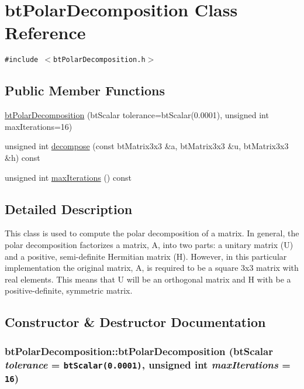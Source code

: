 \hypertarget{classbt_polar_decomposition}{
\section{btPolarDecomposition Class Reference}
\label{classbt_polar_decomposition}
}
{\tt \#include $<$btPolarDecomposition.h$>$}

\subsection*{Public Member Functions}
\begin{CompactItemize}
\item 
\hyperlink{classbt_polar_decomposition_10bfe3fb4d9163c9dce603bf77c0e1a0}{btPolarDecomposition} (btScalar tolerance=btScalar(0.0001), unsigned int maxIterations=16)
\item 
unsigned int \hyperlink{classbt_polar_decomposition_6ab0c88b30522ab42b6202a2f7a17eab}{decompose} (const btMatrix3x3 \&a, btMatrix3x3 \&u, btMatrix3x3 \&h) const 
\item 
unsigned int \hyperlink{classbt_polar_decomposition_c999bd3afdcc94a43ddbea028b5d4867}{maxIterations} () const 
\end{CompactItemize}


\subsection{Detailed Description}
This class is used to compute the polar decomposition of a matrix. In general, the polar decomposition factorizes a matrix, A, into two parts: a unitary matrix (U) and a positive, semi-definite Hermitian matrix (H). However, in this particular implementation the original matrix, A, is required to be a square 3x3 matrix with real elements. This means that U will be an orthogonal matrix and H with be a positive-definite, symmetric matrix. 

\subsection{Constructor \& Destructor Documentation}
\hypertarget{classbt_polar_decomposition_10bfe3fb4d9163c9dce603bf77c0e1a0}{
\subsubsection[btPolarDecomposition]{\setlength{\rightskip}{0pt plus 5cm}btPolarDecomposition::btPolarDecomposition (btScalar {\em tolerance} = {\tt btScalar(0.0001)}, \/  unsigned int {\em maxIterations} = {\tt 16})}}
\label{classbt_polar_decomposition_10bfe3fb4d9163c9dce603bf77c0e1a0}



